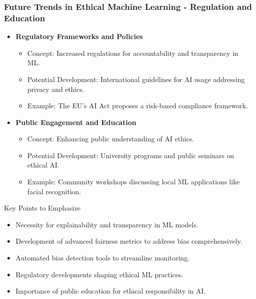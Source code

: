 \documentclass[aspectratio=169]{beamer}
\begin{document}
\begin{frame}[fragile]
    \frametitle{Future Trends in Ethical Machine Learning - Regulation and Education}
    \begin{itemize}
        \item \textbf{Regulatory Frameworks and Policies}
        \begin{itemize}
            \item Concept: Increased regulations for accountability and transparency in ML.
            \item Potential Development: International guidelines for AI usage addressing privacy and ethics.
            \item Example: The EU’s AI Act proposes a risk-based compliance framework.
        \end{itemize}

        \item \textbf{Public Engagement and Education}
        \begin{itemize}
            \item Concept: Enhancing public understanding of AI ethics.
            \item Potential Development: University programs and public seminars on ethical AI.
            \item Example: Community workshops discussing local ML applications like facial recognition.
        \end{itemize}
    \end{itemize}

    \begin{block}{Key Points to Emphasize}
        \begin{itemize}
            \item Necessity for explainability and transparency in ML models.
            \item Development of advanced fairness metrics to address bias comprehensively.
            \item Automated bias detection tools to streamline monitoring.
            \item Regulatory developments shaping ethical ML practices.
            \item Importance of public education for ethical responsibility in AI.
        \end{itemize}
    \end{block}
\end{frame}
\end{document}
